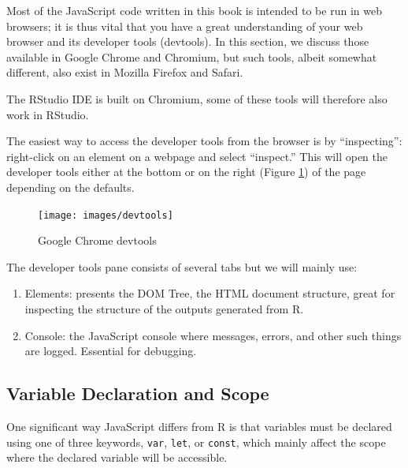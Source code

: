 \documentclass[10pt,]{krantz}
\makeatletter
\providecommand{\tightlist}{%
  \setlength{\itemsep}{0pt}\setlength{\parskip}{0pt}}
\newenvironment{kframe}{%
\medskip{}
\setlength{\fboxsep}{.8em}
 \def\at@end@of@kframe{}%
 \ifinner\ifhmode%
  \def\at@end@of@kframe{\end{minipage}}%
  \begin{minipage}{\columnwidth}%
 \fi\fi%
 \def\FrameCommand##1{\hskip\@totalleftmargin \hskip-\fboxsep
 \colorbox{shadecolor}{##1}\hskip-\fboxsep
     \hskip-\linewidth \hskip-\@totalleftmargin \hskip\columnwidth}%
 \MakeFramed {\advance\hsize-\width
   \@totalleftmargin\z@ \linewidth\hsize
   \@setminipage}}%
 {\par\unskip\endMakeFramed%
 \at@end@of@kframe}
\newenvironment{rmdblock}[1]
  {
  \begin{itemize}
  \renewcommand{\labelitemi}{
    \raisebox{-.7\height}[0pt][0pt]{
      {\setkeys{Gin}{width=3em,keepaspectratio}\texttt{[image: images/\#1]}}
    }
  }
  \setlength{\fboxsep}{1em}
  \begin{kframe}
  \item
  }
  {
  \end{kframe}
  \end{itemize}
  }
\newenvironment{rmdnote}
  {\begin{rmdblock}{note}}
  {\end{rmdblock}}
\makeatother
\begin{document}
Most of the JavaScript code written in this book is intended to be run in web browsers; it is thus vital that you have a great understanding of your web browser and its developer tools (devtools). In this section, we discuss those available in Google Chrome and Chromium, but such tools, albeit somewhat different, also exist in Mozilla Firefox and Safari.

\begin{rmdnote}
The RStudio IDE is built on Chromium, some of these tools will therefore
also work in RStudio.
\end{rmdnote}

The easiest way to access the developer tools from the browser is by ``inspecting'': right-click on an element on a webpage and select ``inspect.'' This will open the developer tools either at the bottom or on the right (Figure \ref{fig:chrome-devtools}) of the page depending on the defaults.

\begin{figure}[H]

{\centering \texttt{[image: images/devtools]} 

}

\caption{Google Chrome devtools}\label{fig:chrome-devtools}
\end{figure}

The developer tools pane consists of several tabs but we will mainly use:

\begin{enumerate}
\def\labelenumi{\arabic{enumi}.}
\tightlist
\item
  Elements: presents the DOM Tree, the HTML document structure, great for inspecting the structure of the outputs generated from R.
\item
  Console: the JavaScript console where messages, errors, and other such things are logged. Essential for debugging.
\end{enumerate}

\hypertarget{basics-var-scope}{%
\subsection{Variable Declaration and Scope}\label{basics-var-scope}}

One significant way JavaScript differs from R is that variables must be declared using one of three keywords, \texttt{var}, \texttt{let}, or \texttt{const}, which mainly affect the scope where the declared variable will be accessible.
\end{document}
